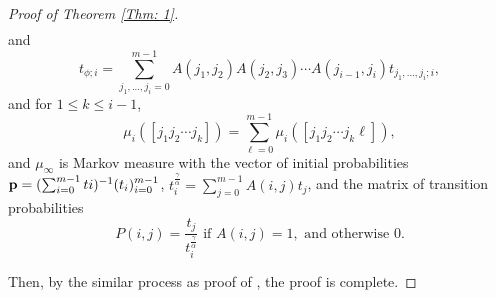 \documentclass{amsart}
\theoremstyle{definition}
\numberwithin{equation}{section}%
\begin{document}
\begin{proof}[Proof of Theorem \ref{Thm: 1}]
\begin{align*}
\end{align*}
 and
\begin{equation}\label{eq 3.1-2}
    t_{\phi;i}=\sum_{j_1,...,j_i=0}^{m-1}A(j_1,j_2)A(j_2,j_3)\cdots A(j_{i-1},j_i)t_{j_1,...,j_i;i},
\end{equation}
and for $1\leq k \leq i-1$,
\begin{equation*}
    \mu_{i}([j_1j_2\cdots j_k])=\sum_{\ell=0}^{m-1}\mu_{i}([j_1j_2\cdots j_k \ell]),
\end{equation*}
and $\mu_\infty$ is Markov measure with the vector of initial
probabilities ${\bf p} = (\sum_{i=0}^{m-1}  ti)^{-1} (t_i)_{i=0}^{m-1}$, $t_{i}^{\frac{\gamma}{\alpha}}=\sum_{j=0}^{m-1}A(i,j)t_{j}$, and the matrix of transition probabilities
\begin{equation*}
    P(i,j)=\frac{t_j}{t_i^{\frac{\gamma}{\alpha}}} \mbox{ if } A(i, j) = 1, \mbox{ and otherwise }0.
\end{equation*}

Then, by the similar process as proof of \cite[Theorem 1.3 (2)]{ban2024hausdorffaffine}, the proof is complete.
\end{proof}
\end{document}
